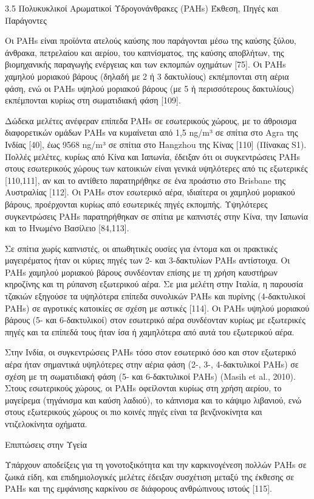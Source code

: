 3.5 Πολυκυκλικοί Αρωματικοί Υδρογονάνθρακες (PAHs)
Έκθεση, Πηγές και Παράγοντες

Οι PAHs είναι προϊόντα ατελούς καύσης που παράγονται μέσω της καύσης ξύλου, άνθρακα, πετρελαίου και αερίου, του καπνίσματος, της καύσης αποβλήτων, της βιομηχανικής παραγωγής ενέργειας και των εκπομπών οχημάτων [75]. Οι PAHs χαμηλού μοριακού βάρους (δηλαδή με 2 ή 3 δακτυλίους) εκπέμπονται στη αέρια φάση, ενώ οι PAHs υψηλού μοριακού βάρους (με 5 ή περισσότερους δακτυλίους) εκπέμπονται κυρίως στη σωματιδιακή φάση [109].

Δώδεκα μελέτες ανέφεραν επίπεδα PAHs σε εσωτερικούς χώρους, με το άθροισμα διαφορετικών ομάδων PAHs να κυμαίνεται από 1,5 ng/m³ σε σπίτια στο Agra της Ινδίας [40], έως 9568 ng/m³ σε σπίτια στο Hangzhou της Κίνας [110] (Πίνακας S1). Πολλές μελέτες, κυρίως από Κίνα και Ιαπωνία, έδειξαν ότι οι συγκεντρώσεις PAHs στους εσωτερικούς χώρους των κατοικιών είναι γενικά υψηλότερες από τις εξωτερικές [110,111], αν και το αντίθετο παρατηρήθηκε σε ένα προάστιο στο Brisbane της Αυστραλίας [112]. Οι PAHs στον εσωτερικό αέρα, ιδιαίτερα οι χαμηλού μοριακού βάρους, προέρχονται κυρίως από εσωτερικές πηγές εκπομπής. Υψηλότερες συγκεντρώσεις PAHs παρατηρήθηκαν σε σπίτια με καπνιστές στην Κίνα, την Ιαπωνία και το Ηνωμένο Βασίλειο [84,113].

Σε σπίτια χωρίς καπνιστές, οι απωθητικές ουσίες για έντομα και οι πρακτικές μαγειρέματος ήταν οι κύριες πηγές των 2- και 3-δακτυλίων PAHs αντίστοιχα. Οι PAHs χαμηλού μοριακού βάρους συνδέονταν επίσης με τη χρήση καυστήρων κηροζίνης και τη ρύπανση εξωτερικού αέρα. Σε μια μελέτη στην Ιταλία, η παρουσία τζακιών εξηγούσε τα υψηλότερα επίπεδα συνολικών PAHs και πυρίνης (4-δακτυλικοί PAHs) σε αγροτικές κατοικίες σε σχέση με αστικές [114]. Οι PAHs υψηλού μοριακού βάρους (5- και 6-δακτυλικοί) στον εσωτερικό αέρα συνδέονταν κυρίως με εξωτερικές πηγές και τα επίπεδά τους ήταν ίσα ή χαμηλότερα από αυτά του εξωτερικού αέρα.

Στην Ινδία, οι συγκεντρώσεις PAHs τόσο στον εσωτερικό όσο και στον εξωτερικό αέρα ήταν σημαντικά υψηλότερες στην αέρια φάση (2-, 3-, 4-δακτυλικοί PAHs) σε σχέση με τη σωματιδιακή φάση (5- και 6-δακτυλικοί PAHs) (Masih et al., 2010). Στους εσωτερικούς χώρους, οι PAHs οφείλονται κυρίως στη χρήση αερίου, το μαγείρεμα (τηγάνισμα και καύση λαδιού), το κάπνισμα και το κάψιμο λιβανιού, ενώ στους εξωτερικούς χώρους οι πιο κοινές πηγές είναι τα βενζινοκίνητα και ντιζελοκίνητα οχήματα.

Επιπτώσεις στην Υγεία

Υπάρχουν αποδείξεις για τη γονοτοξικότητα και την καρκινογένεση πολλών PAHs σε ζωικά είδη, και επιδημιολογικές μελέτες έδειξαν συσχέτιση μεταξύ της έκθεσης σε PAHs και της εμφάνισης καρκίνου σε διάφορους ανθρώπινους ιστούς [115].

